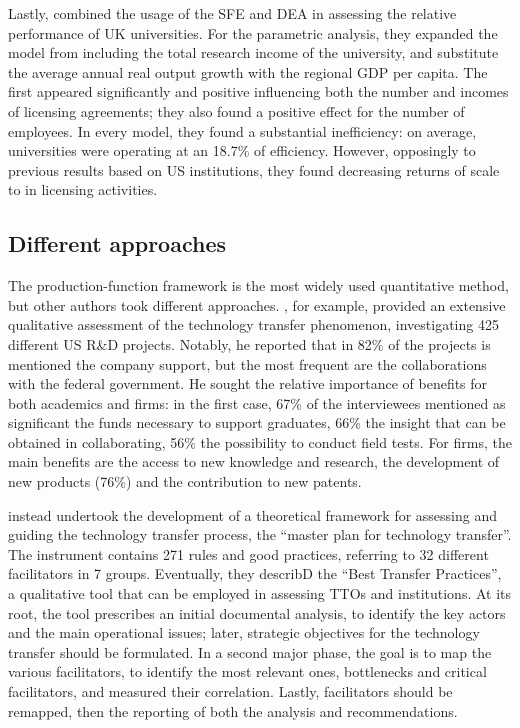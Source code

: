 Lastly, \citet{Chapple2005} combined the usage of the SFE and DEA in assessing the relative performance of UK universities. For the parametric analysis, they expanded the model from \citet{Siegel2003a} including the total research income of the university, and substitute the average annual real output growth with the regional GDP per capita. The  first appeared significantly and positive influencing both the number and incomes of licensing agreements; they also found a positive effect for the number of employees. In every model, they found a substantial inefficiency: on average, universities were operating at an 18.7\% of efficiency. However, opposingly to previous results based on US institutions, they found decreasing returns of scale to in licensing activities.

\subsection{Different approaches}

The production-function framework is the most widely used quantitative method, but other authors took different approaches. \citet{Lee2000}, for example, provided an extensive qualitative assessment of the technology transfer phenomenon, investigating 425 different US R\&D projects. Notably, he reported that in 82\% of the projects is mentioned the company support, but the most frequent are the collaborations with the federal government. He sought the relative importance of benefits for both academics and firms: in the first case, 67\% of the interviewees mentioned as significant the funds necessary to support graduates, 66\% the insight that can be obtained in collaborating, 56\% the possibility to conduct field tests. For firms, the main benefits are the access to new knowledge and research, the development of new products (76\%) and the contribution to new patents.

\citet{Resende2013} instead undertook the development of a theoretical framework for assessing and guiding the technology transfer process, the \enquote{master plan for technology transfer}. The instrument contains 271 rules and good practices, referring to 32 different facilitators in 7 groups. Eventually, they describD the \enquote{Best Transfer Practices}, a qualitative tool that can be employed in assessing TTOs and institutions. At its root, the tool prescribes an initial documental analysis, to identify the key actors and the main operational issues; later, strategic objectives for the technology transfer should be formulated. In a second major phase, the goal is to map the various facilitators, to identify the most relevant ones, bottlenecks and critical facilitators, and measured their correlation. Lastly, facilitators should be remapped, then the reporting of both the analysis and recommendations. 

